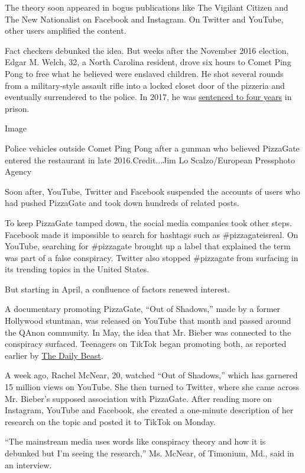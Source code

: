 The theory soon appeared in bogus publications like The Vigilant Citizen
and The New Nationalist on Facebook and Instagram. On Twitter and
YouTube, other users amplified the content.

Fact checkers debunked the idea. But weeks after the November 2016
election, Edgar M. Welch, 32, a North Carolina resident, drove six hours
to Comet Ping Pong to free what he believed were enslaved children. He
shot several rounds from a military-style assault rifle into a locked
closet door of the pizzeria and eventually surrendered to the police. In
2017, he was
\href{https://www.nytimes.com/2017/06/22/us/pizzagate-attack-sentence.html}{sentenced
to four years} in prison.

Image

Police vehicles outside Comet Ping Pong after a gunman who believed
PizzaGate entered the restaurant in late 2016.Credit...Jim Lo
Scalzo/European Pressphoto Agency

Soon after, YouTube, Twitter and Facebook suspended the accounts of
users who had pushed PizzaGate and took down hundreds of related posts.

To keep PizzaGate tamped down, the social media companies took other
steps. Facebook made it impossible to search for hashtags such as
\#pizzagateisreal. On YouTube, searching for \#pizzagate brought up a
label that explained the term was part of a false conspiracy. Twitter
also stopped \#pizzagate from surfacing in its trending topics in the
United States.

But starting in April, a confluence of factors renewed interest.

A documentary promoting PizzaGate, ``Out of Shadows,'' made by a former
Hollywood stuntman, was released on YouTube that month and passed around
the QAnon community. In May, the idea that Mr. Bieber was connected to
the conspiracy surfaced. Teenagers on TikTok began promoting both, as
reported earlier by
\href{https://www.thedailybeast.com/tiktok-teens-are-obsessed-with-pizzagate}{The
Daily Beast}.

A week ago, Rachel McNear, 20, watched ``Out of Shadows,'' which has
garnered 15 million views on YouTube. She then turned to Twitter, where
she came across Mr. Bieber's supposed association with PizzaGate. After
reading more on Instagram, YouTube and Facebook, she created a
one-minute description of her research on the topic and posted it to
TikTok on Monday.

``The mainstream media uses words like conspiracy theory and how it is
debunked but I'm seeing the research,'' Ms. McNear, of Timonium, Md.,
said in an interview.

